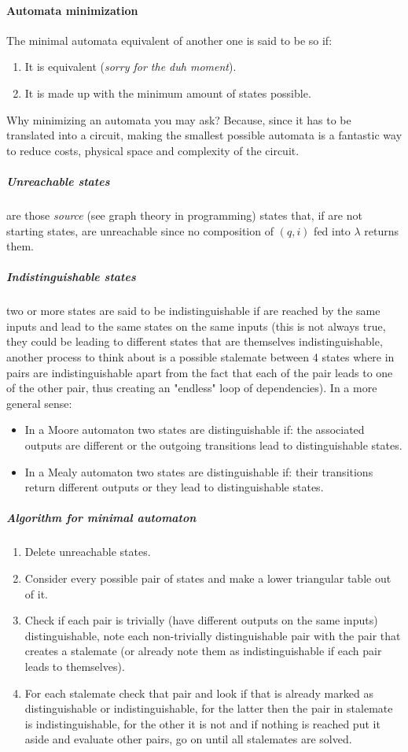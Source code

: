 \documentclass{scrartcl}
\begin{document}
    \paragraph{Automata minimization} The minimal automata equivalent of another one is said to be so if:
    \begin{enumerate}
        \item It is equivalent (\emph{sorry for the duh moment}).
        \item It is made up with the minimum amount of states possible.
    \end{enumerate}
    Why minimizing an automata you may ask? Because, since it has to be translated into a circuit, making the smallest possible automata is a fantastic way to reduce costs, physical space and complexity of the circuit.
    \subparagraph{Unreachable states} are those \emph{source} (see graph theory in programming) states that, if are not starting states, are unreachable since no composition of $(q, i)$ fed into $\lambda$ returns them. 
    \subparagraph{Indistinguishable states} two or more states are said to be indistinguishable if are reached by the same inputs and lead to the same states on the same inputs (this is not always true, they could be leading to different states that are themselves indistinguishable, another process to think about is a possible stalemate between 4 states where in pairs are indistinguishable apart from the fact that each of the pair leads to one of the other pair, thus creating an "endless" loop of dependencies).
    In a more general sense:
    \begin{itemize}
        \item In a Moore automaton two states are distinguishable if: the associated outputs are different or the outgoing transitions lead to distinguishable states.
        \item In a Mealy automaton two states are distinguishable if: their transitions return different outputs or they lead to distinguishable states.
    \end{itemize}
    \subparagraph{Algorithm for minimal automaton}
    \begin{enumerate}
        \item Delete unreachable states.
        \item Consider every possible pair of states and make a lower triangular table out of it.
        \item Check if each pair is trivially (have different outputs on the same inputs) distinguishable, note each non-trivially distinguishable pair with the pair that creates a stalemate (or already note them as indistinguishable if each pair leads to themselves).
        \item For each stalemate check that pair and look if that is already marked as distinguishable or indistinguishable, for the latter then the pair in stalemate is indistinguishable, for the other it is not and if nothing is reached put it aside and evaluate other pairs, go on until all stalemates are solved.
    \end{enumerate}
\end{document}
